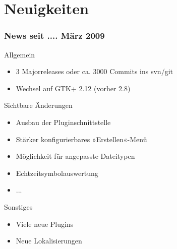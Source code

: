 \section{Neuigkeiten}
\begin{frame}
	\frametitle{News seit .... März 2009}
	\begin{block}{Allgemein}
		\begin{itemize}
			\item 3 Majorreleases oder ca. 3000 Commits ins svn/git
			\item Wechsel auf GTK+ 2.12 (vorher 2.8)
		\end{itemize}
	\end{block}
	\begin{block}{Sichtbare Änderungen}
		\begin{itemize}
			\item Ausbau der Pluginschnittstelle
			\item Stärker konfigurierbares »Erstellen«-Menü
			\item Möglichkeit für angepasste Dateitypen
			\item Echtzeitsymbolauswertung
			\item ...
		\end{itemize}
	\end{block}
	\begin{block}{Sonstiges}
		\begin{itemize}
			\item Viele neue Plugins
			\item Neue Lokalisierungen
		\end{itemize}
	\end{block}
\end{frame}
